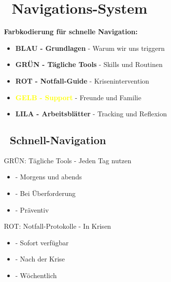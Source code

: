 \section*{\texorpdfstring{\textcolor{ctmmBlue}{\faMap~Navigations-System}}{Navigations-System}}
\label{sec:navigation}

\begin{ctmmBlueBox}[title=Orientierung im CTMM-System]
\textbf{Farbkodierung für schnelle Navigation:}

\begin{itemize}
    \item \textcolor{ctmmBlue}{\textbf{BLAU - Grundlagen}} - Warum wir uns triggern
    \item \textcolor{ctmmGreen}{\textbf{GRÜN - Tägliche Tools}} - Skills und Routinen  
    \item \textcolor{ctmmRed}{\textbf{ROT - Notfall-Guide}} - Krisenintervention
    \item \textcolor{yellow}{\textbf{GELB - Support}} - Freunde und Familie
    \item \textcolor{ctmmPurple}{\textbf{LILA - Arbeitsblätter}} - Tracking und Reflexion
\end{itemize}
\end{ctmmBlueBox}

\vspace{0.5cm}

\subsection*{\faChevronRight~Schnell-Navigation}

\begin{ctmmGreenBox}{GRÜN: Tägliche Tools - Jeden Tag nutzen}
\begin{itemize}
    \item {} - Morgens und abends
    \item {} - Bei Überforderung
    \item {} - Präventiv
\end{itemize}
\end{ctmmGreenBox}

\begin{ctmmRedBox}{ROT: Notfall-Protokolle - In Krisen}
\begin{itemize}
    \item {} - Sofort verfügbar
    \item {} - Nach der Krise
    \item {} - Wöchentlich
\end{itemize}
\end{ctmmRedBox}


